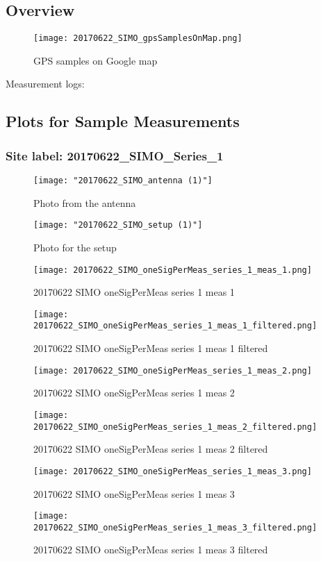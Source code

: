 \subsection{Overview}
\begin{figure}[ht] \caption{GPS samples on Google map}
\texttt{[image: 20170622\_SIMO\_gpsSamplesOnMap.png]}\centering\end{figure}
\begin{minipage}{\textwidth} Measurement logs:

 \end{minipage}
\clearpage
\subsection{Plots for Sample Measurements}
\subsubsection{Site label: 20170622\_SIMO\_Series\_1}
\begin{figure}[ht] \caption{Photo from the antenna}
\texttt{[image: "20170622\_SIMO\_antenna (1)"]}\centering\end{figure}
\begin{figure}[ht] \caption{Photo for the setup}
\texttt{[image: "20170622\_SIMO\_setup (1)"]}\centering\end{figure}
\begin{figure}[ht] \caption{20170622 SIMO oneSigPerMeas series 1 meas 1}
\texttt{[image: 20170622\_SIMO\_oneSigPerMeas\_series\_1\_meas\_1.png]}\centering\end{figure}
\begin{figure}[ht] \caption{20170622 SIMO oneSigPerMeas series 1 meas 1 filtered}
\texttt{[image: 20170622\_SIMO\_oneSigPerMeas\_series\_1\_meas\_1\_filtered.png]}\centering\end{figure}
\begin{figure}[ht] \caption{20170622 SIMO oneSigPerMeas series 1 meas 2}
\texttt{[image: 20170622\_SIMO\_oneSigPerMeas\_series\_1\_meas\_2.png]}\centering\end{figure}
\begin{figure}[ht] \caption{20170622 SIMO oneSigPerMeas series 1 meas 2 filtered}
\texttt{[image: 20170622\_SIMO\_oneSigPerMeas\_series\_1\_meas\_2\_filtered.png]}\centering\end{figure}
\begin{figure}[ht] \caption{20170622 SIMO oneSigPerMeas series 1 meas 3}
\texttt{[image: 20170622\_SIMO\_oneSigPerMeas\_series\_1\_meas\_3.png]}\centering\end{figure}
\begin{figure}[ht] \caption{20170622 SIMO oneSigPerMeas series 1 meas 3 filtered}
\texttt{[image: 20170622\_SIMO\_oneSigPerMeas\_series\_1\_meas\_3\_filtered.png]}\centering\end{figure}
\clearpage
